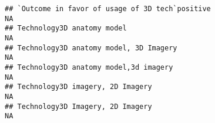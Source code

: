 \documentclass[]{article}
\begin{document}
\begin{verbatim}
## `Outcome in favor of usage of 3D tech`positive                                                                                                                                                                                                                                                                                                                                                                                                                                        NA
## Technology3D anatomy model                                                                                                                                                                                                                                                                                                                                                                                                                                                            NA
## Technology3D anatomy model, 3D Imagery                                                                                                                                                                                                                                                                                                                                                                                                                                                NA
## Technology3D anatomy model,3d imagery                                                                                                                                                                                                                                                                                                                                                                                                                                                 NA
## Technology3D imagery, 2D Imagery                                                                                                                                                                                                                                                                                                                                                                                                                                                      NA
## Technology3D Imagery, 2D Imagery                                                                                                                                                                                                                                                                                                                                                                                                                                                      NA

\end{verbatim}
\end{document}
